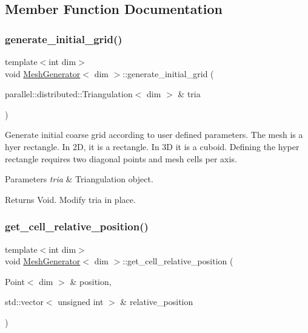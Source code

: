 \subsection{Member Function Documentation}
\mbox{\label{class_mesh_generator_a57b433e53fa1b80670a76a1e0c898963}} 
\subsubsection{\texorpdfstring{generate\+\_\+initial\+\_\+grid()}{generate\_initial\_grid()}}
{\footnotesize\ttfamily template$<$int dim$>$ \\
void \hyperlink{class_mesh_generator}{Mesh\+Generator}$<$ dim $>$\+::generate\+\_\+initial\+\_\+grid (\begin{DoxyParamCaption}\item[{parallel\+::distributed\+::\+Triangulation$<$ dim $>$ \&}]{tria }\end{DoxyParamCaption})\hspace{0.3cm}{\ttfamily [private]}}

Generate initial coarse grid according to user defined parameters. The mesh is a hyer rectangle. In 2D, it is a rectangle. In 3D it is a cuboid. Defining the hyper rectangle requires two diagonal points and mesh cells per axis.


\begin{DoxyParams}{Parameters}
{\em tria} & Triangulation object. \\
\hline
\end{DoxyParams}
\begin{DoxyReturn}{Returns}
Void. Modify tria in place. 
\end{DoxyReturn}
\mbox{\label{class_mesh_generator_a9b3414fd31d1d06b0cc4a0c345bc6542}} 
\subsubsection{\texorpdfstring{get\+\_\+cell\+\_\+relative\+\_\+position()}{get\_cell\_relative\_position()}}
{\footnotesize\ttfamily template$<$int dim$>$ \\
void \hyperlink{class_mesh_generator}{Mesh\+Generator}$<$ dim $>$\+::get\+\_\+cell\+\_\+relative\+\_\+position (\begin{DoxyParamCaption}\item[{Point$<$ dim $>$ \&}]{position,  }\item[{std\+::vector$<$ unsigned int $>$ \&}]{relative\+\_\+position }\end{DoxyParamCaption})\hspace{0.3cm}{\ttfamily [private]}}

